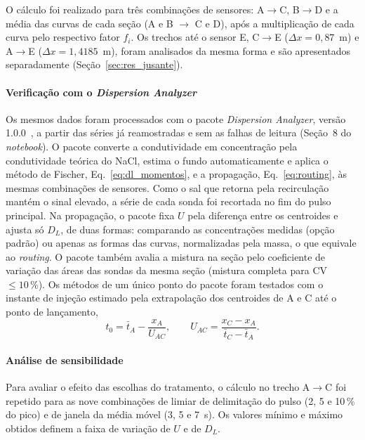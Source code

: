 \documentclass[12pt,a4paper]{article}
\begin{document}
O cálculo foi realizado para três combinações de sensores: A$\rightarrow$C, B$\rightarrow$D e a média das curvas de cada seção (A e B $\rightarrow$ C e D), após a multiplicação de cada curva pelo respectivo fator $f_i$. Os trechos até o sensor E, C$\rightarrow$E ($\Delta x = 0{,}87$~m) e A$\rightarrow$E ($\Delta x = 1{,}4185$~m), foram analisados da mesma forma e são apresentados separadamente (Seção~\ref{sec:res_jusante}).

\paragraph{Verificação com o \emph{Dispersion Analyzer}}
Os mesmos dados foram processados com o pacote \emph{Dispersion Analyzer}, versão 1.0.0~\cite{bueno2026}, a partir das séries já reamostradas e sem as falhas de leitura (Seção~8 do \emph{notebook}). O pacote converte a condutividade em concentração pela condutividade teórica do NaCl, estima o fundo automaticamente e aplica o método de Fischer, Eq.~\eqref{eq:dl_momentos}, e a propagação, Eq.~\eqref{eq:routing}, às mesmas combinações de sensores. Como o sal que retorna pela recirculação mantém o sinal elevado, a série de cada sonda foi recortada no fim do pulso principal. Na propagação, o pacote fixa $U$ pela diferença entre os centroides e ajusta só $D_L$, de duas formas: comparando as concentrações medidas (opção padrão) ou apenas as formas das curvas, normalizadas pela massa, o que equivale ao \emph{routing}. O pacote também avalia a mistura na seção pelo coeficiente de variação das áreas das sondas da mesma seção (mistura completa para CV $\leq 10\,\%$). Os métodos de um único ponto do pacote foram testados com o instante de injeção estimado pela extrapolação dos centroides de A e C até o ponto de lançamento,
\begin{equation}
  t_0 = \bar{t}_A - \frac{x_A}{U_{AC}}, \qquad U_{AC} = \frac{x_C - x_A}{\bar{t}_C - \bar{t}_A}.
  \label{eq:t0}
\end{equation}

\paragraph{Análise de sensibilidade}
Para avaliar o efeito das escolhas do tratamento, o cálculo no trecho A$\rightarrow$C foi repetido para as nove combinações de limiar de delimitação do pulso (2, 5 e 10\,\% do pico) e de janela da média móvel (3, 5 e 7~s). Os valores mínimo e máximo obtidos definem a faixa de variação de $U$ e de $D_L$.
\end{document}
